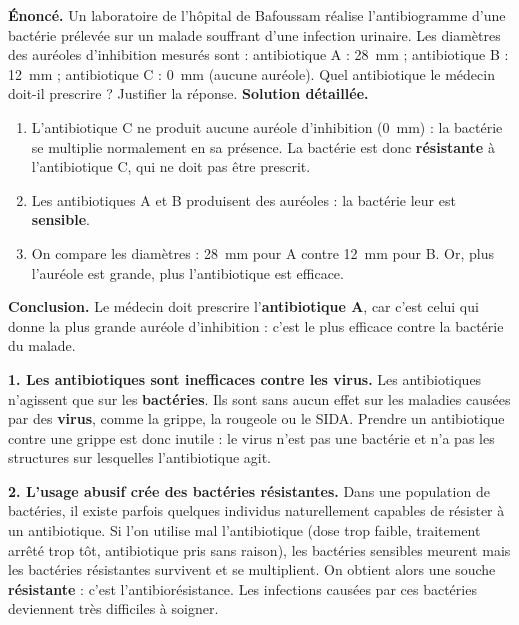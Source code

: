 \documentclass[11pt]{article}
\newcommand{\cle}[1]{{\popxbold\color{popdark}#1}}
\newcounter{popsec}
\newcounter{popsub}
\newcommand{\courssub}[1]{%
  \stepcounter{popsub}%
  \par\vspace{9pt}\noindent{\popxbold\fontsize{11.5}{13}\selectfont\color{popink}{\color{poporange}\thepopsec.\thepopsub}\hspace{6pt}#1}\par\nopagebreak\vspace{4pt}
}
\begin{document}
\begin{exoresolu}
\textbf{Énoncé.} Un laboratoire de l'hôpital de Bafoussam réalise l'antibiogramme d'une bactérie prélevée sur un malade souffrant d'une infection urinaire. Les diamètres des auréoles d'inhibition mesurés sont : antibiotique A : \SI{28}{mm} ; antibiotique B : \SI{12}{mm} ; antibiotique C : \SI{0}{mm} (aucune auréole). Quel antibiotique le médecin doit-il prescrire ? Justifier la réponse.
\tcblower
\textbf{Solution détaillée.}
\begin{enumerate}
\item L'antibiotique C ne produit aucune auréole d'inhibition (\SI{0}{mm}) : la bactérie se multiplie normalement en sa présence. La bactérie est donc \textbf{résistante} à l'antibiotique C, qui ne doit pas être prescrit.
\item Les antibiotiques A et B produisent des auréoles : la bactérie leur est \textbf{sensible}.
\item On compare les diamètres : \SI{28}{mm} pour A contre \SI{12}{mm} pour B. Or, plus l'auréole est grande, plus l'antibiotique est efficace.
\end{enumerate}
\textbf{Conclusion.} Le médecin doit prescrire l'\textbf{antibiotique A}, car c'est celui qui donne la plus grande auréole d'inhibition : c'est le plus efficace contre la bactérie du malade.
\end{exoresolu}

\courssub{Les limites de l'antibiothérapie}

\textbf{1. Les antibiotiques sont inefficaces contre les virus.} Les antibiotiques n'agissent que sur les \textbf{bactéries}. Ils sont sans aucun effet sur les maladies causées par des \textbf{virus}, comme la grippe, la rougeole ou le SIDA. Prendre un antibiotique contre une grippe est donc inutile : le virus n'est pas une bactérie et n'a pas les structures sur lesquelles l'antibiotique agit.

\textbf{2. L'usage abusif crée des bactéries résistantes.} Dans une population de bactéries, il existe parfois quelques individus naturellement capables de résister à un antibiotique. Si l'on utilise mal l'antibiotique (dose trop faible, traitement arrêté trop tôt, antibiotique pris sans raison), les bactéries sensibles meurent mais les bactéries résistantes survivent et se multiplient. On obtient alors une souche \textbf{résistante} : c'est l'\cle{antibiorésistance}. Les infections causées par ces bactéries deviennent très difficiles à soigner.
\end{document}
